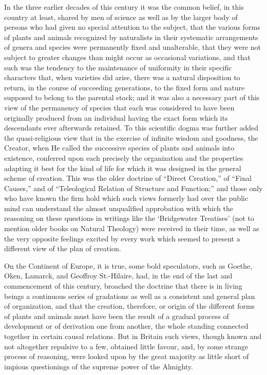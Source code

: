 \documentclass[a4paper, 11pt, oneside, english]{article}
\begin{document}
In the three earlier decades of this century it was the common belief, in this country at least, shared by men of science as well as by the larger body of persons who had given no special attention to the subject, that the various forms of plants and animals recognized by naturalists in their systematic arrangements of genera and species were permanently fixed and unalterable, that they were not subject to greater changes than might occur as occasional variations, and that such was the tendency to the maintenance of uniformity in their specific characters that, when varieties did arise, there was a natural disposition to return, in the course of succeeding generations, to the fixed form and nature supposed to belong to the parental stock; and it was also a necessary part of this view of the permanency of species that each was considered to have been originally produced from an individual having the exact form which its descendants ever afterwards retained. To this scientific dogma was further added the quasi-religious view that in the exercise of infinite wisdom and goodness, the Creator, when He called the successive species of plants and animals into existence, conferred upon each precisely the organization and the properties adapting it best for the kind of life for which it was designed in the general scheme of creation. This was the older doctrine of ``Direct Creation,'' of ``Final Causes,'' and of ``Teleological Relation of Structure and Function;'' and those only who have known the firm hold which such views formerly had over the public mind can understand the almost unqualified approbation with which the reasoning on these questions in writings like the `Bridgewater Treatises' (not to mention older books on Natural Theology) were received in their time, as well as the very opposite feelings excited by every work which seemed to present a different view of the plan of creation.

On the Continent of Europe, it is true, some bold speculators, such as Goethe, Oken, Lamarck, and Geoffroy St.-Hilaire, had, in the end of the last and commencement of this century, broached the doctrine that there is in living beings a continuous series of gradations as well as a consistent and general plan of organization, and that the creation, therefore, or origin of the different forms of plants and animals must have been the result of a gradual process of development or of derivation one from another, the whole standing connected together in certain causal relations. But in Britain such views, though known and not altogether repulsive to a few, obtained little favour, and, by some strange process of reasoning, were looked upon by the great majority as little short of impious questionings of the supreme power of the Almighty.
\end{document}
